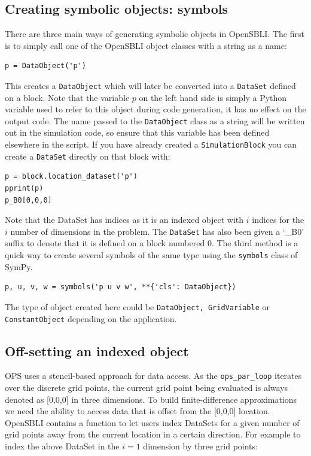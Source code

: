 \documentclass[11pt]{article}
\begin{document}
\subsection{Creating symbolic objects: symbols}
There are three main ways of generating symbolic objects in OpenSBLI. The first is to simply call one of the OpenSBLI object classes with a string as a name:
\begin{lstlisting}
p = DataObject('p')
\end{lstlisting}
This creates a \verb|DataObject| which will later be converted into a \verb|DataSet| defined on a block. Note that the variable $p$ on the left hand side is simply a Python variable used to refer to this object during code generation, it has no effect on the output code. The name passed to the \verb|DataObject| class as a string will be written out in the simulation code, so ensure that this variable has been defined elsewhere in the script. If you have already created a \verb|SimulationBlock| you can create a \verb|DataSet| directly on that block with:
\begin{lstlisting}
p = block.location_dataset('p')
pprint(p)
p_B0[0,0,0]
\end{lstlisting}
Note that the DataSet has indices as it is an indexed object with $i$ indices for the $i$ number of dimensions in the problem. The \verb|DataSet| has also been given a `\_B0' suffix to denote that it is defined on a block numbered 0. The third method is a quick way to create several symbols of the same type using the \verb|symbols| class of SymPy.
\begin{lstlisting}
p, u, v, w = symbols('p u v w', **{'cls': DataObject})
\end{lstlisting}
The type of object created here could be \verb|DataObject, GridVariable| or \verb|ConstantObject| depending on the application.

\subsection{Off-setting an indexed object}
OPS uses a stencil-based approach for data access. As the \verb|ops_par_loop| iterates over the discrete grid points, the current grid point being evaluated is always denoted as [0,0,0] in three dimensions. To build finite-difference approximations we need the ability to access data that is offset from the [0,0,0] location. OpenSBLI contains a function to let users index DataSets for a given number of grid points away from the current location in a certain direction. For example to index the above DataSet in the $i=1$ dimension by three grid points:
\end{document}
